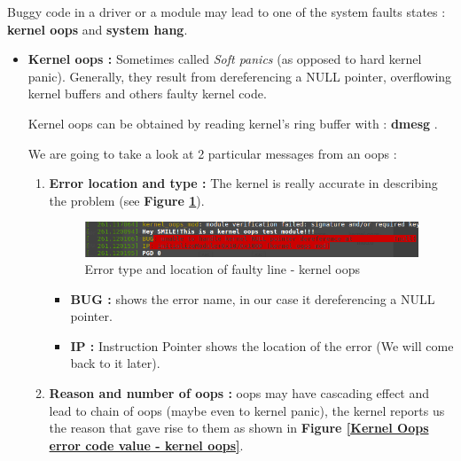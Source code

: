 Buggy code in a driver or a module may lead to one of the system faults states : \textbf{kernel oops} and \textbf{system hang}.\\
\vspace{8px}

\begin{itemize}
	\item \textbf{Kernel oops : } Sometimes called \emph{Soft panics} (as opposed to hard kernel panic). Generally, they result from dereferencing a NULL pointer, overflowing kernel buffers and others faulty kernel code.\\
\vspace{5px}	


\begin{center}
\begin{mdframed}[
        linecolor=red,linewidth=2pt,%
        frametitlerule=true,%
        apptotikzsetting={\tikzset{mdfframetitlebackground/.append style={%
            shade,left color=white, right color=blue!20}}}, 
        frametitlerulecolor=blue,
        frametitlerulewidth=1pt, innertopmargin=\topskip,
        frametitle={Reading Kernel Oop},
        outerlinewidth=1.25pt
    ]
Kernel oops can be obtained by reading kernel's ring buffer with : \og \textbf{dmesg} \fg.
\end{mdframed}
\end{center}
	
\vspace{6px}	
We are going to take a look at 2 particular messages from an oops : 	

	\begin{enumerate}
		\item \textbf{Error location and type : } The kernel is really accurate in describing the problem (see \textbf{Figure \ref{Error type and location of faulty line - kernel oops}}).
		
\begin{figure}[H]
		\centering
        \includegraphics[scale=0.5]{img/solution/oops-error-kernel.png}
        \caption{Error type and location of faulty line - kernel oops}
        \label{Error type and location of faulty line - kernel oops}
    \end{figure}		
		
		
			\begin{itemize}
				\item \textbf{BUG : } shows the error name, in our case it \og dereferencing a NULL pointer\fg.				
				\item \textbf{IP : } Instruction Pointer shows the location of the error (We will come back to it later).
			\end{itemize}					
		\item \textbf{Reason and number of oops : } oops may have cascading effect and lead to chain of oops (maybe even to kernel panic), the kernel  reports us the reason that gave rise to them as shown in \textbf{Figure \ref{Kernel Oops error code value - kernel oops}}.


\end{enumerate}
\end{itemize}
